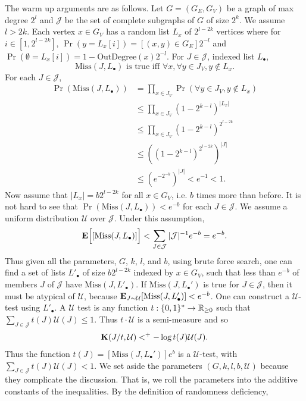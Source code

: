 \documentclass[11pt]{article}\textwidth 6.5in\textheight 9in
\begin{document}
The warm up arguments are as follows. Let $G=(G_E,G_V)$ be a graph of max degree $2^l$ and $\mathcal{J}$ be the set of complete subgraphs of $G$ of size $2^k$. We assume $l>2k$. Each vertex $x\in G_V$ has a random list $L_x$ of $2^{l-2k}$ vertices where for $i\in[1,2^{l-2k}]$, $\Pr(y= L_x[i])=[(x,y)\in G_E]2^{-l}$ and $\Pr(\emptyset=L_x[i])=1-\mathrm{OutDegree}(x)2^{-l}$. For $J\in\mathcal{J}$, indexed list $L_\bullet$, 
$$\mathrm{Miss}(J,L_\bullet)\textrm{ is true iff }\forall x,\forall y\in J_V, y\not\in L_x.$$ 
For each $J\in\mathcal{J}$, 
\begin{align*}
\Pr(\mathrm{Miss}(J,L_\bullet))& = \prod_{x\in J_V}\Pr(\forall y\in J_V,y\not\in L_x) \\
&\leq \prod_{x\in J_V}\left(1-2^{k-l}\right)^{|L_x|}\\
&\leq \prod_{x\in J_V}\left(1-2^{k-l}\right)^{2^{l-2k}}\\
&\leq \left((1-2^{k-l})^{2^{l-2k}}\right)^{|J|}\\
& \leq {\left(e^{-2^{-k}}\right)}^{|J|} < e^{-1}< 1.
\end{align*}
Now assume that $|L_x| = b2^{l-2k}$ for all $x \in G_V$, i.e. $b$ times more than before. It is not hard to see that $\Pr(\mathrm{Miss}(J,L_\bullet))< e^{-b}$ for each $J\in\mathcal{J}$. We assume a uniform distribution $\mathcal{U}$ over $\mathcal{J}$. Under this assumption,
\begin{align*}
{\mathbf E}\Big[[\mathrm{Miss}(J,L_\bullet)]\Big]<\sum_{J\in\mathcal{J}} |\mathcal{J}|^{-1}e^{-b}= e^{-b}.
\end{align*}
Thus given all the parameters, $G$, $k$, $l$, and $b$, using brute force search, one can find a set of lists $L'_\bullet$ of size $b2^{l-2k}$ indexed by $x\in G_V$, such that less than $e^{-b}$ of members $J$ of $\mathcal{J}$ have $\mathrm{Miss}(J,L'_\bullet)$. If $\mathrm{Miss}(J,L_\bullet')$ is true for $J\in \mathcal{J}$, then it must be atypical of $\mathcal{U}$, because ${\mathbf E}_{J\sim\mathcal{U}}[\mathrm{Miss}(J,L_\bullet')]<e^{-b}$. One can construct a $\mathcal{U}$-test using $L'_\bullet$. A $\mathcal{U}$ test is any function $t:\{0,1\}^*\rightarrow \mathbb{R}_{\geq 0}$ such that $\sum_{J\in\mathcal{J}}t(J)\mathcal{U}(J)\leq 1$. Thus $t\cdot \mathcal{U}$ is a semi-measure and so
\begin{align}
\label{eq:testsemi}
{\mathbf K}(J/t,\mathcal{U}) <^+ -\log t(J)\mathcal{U}(J).
\end{align}
Thus the function $t(J)=[\mathrm{Miss}(J,L_\bullet')]e^b$ is a $\mathcal{U}$-test, with $\sum_{J\in\mathcal{J}}t(J)\mathcal{U}(J)<1$. We set aside the parameters $(G,k,l,b,\mathcal{U})$ because they complicate the discussion. That is, we roll the parameters into the additive constants of the inequalities.
By the definition of randomness deficiency,
\end{document}

